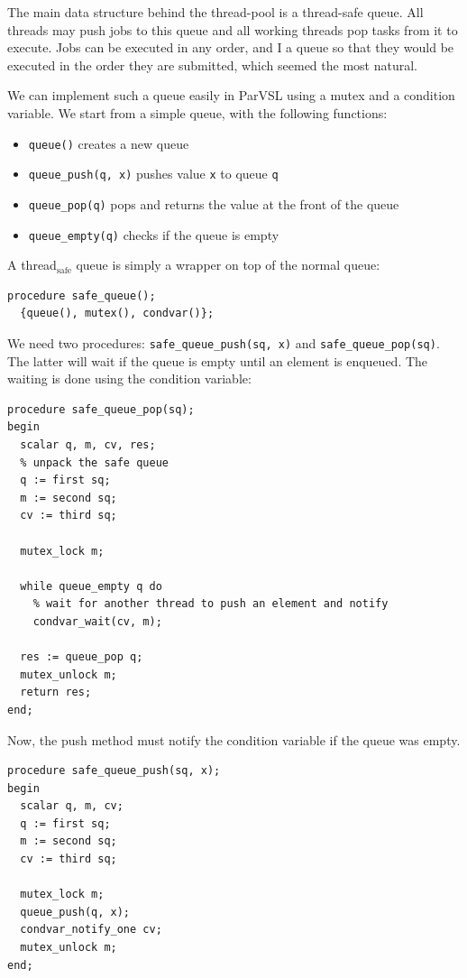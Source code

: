 The main data structure behind the thread-pool is a thread-safe queue. All threads may push
jobs to this queue and all working threads pop tasks from it to execute. Jobs can be executed
in any order, and I a queue so that they would be executed in the order they are submitted, which
seemed the most natural.

We can implement such a queue easily in ParVSL using a mutex and a condition variable. We start
from a simple queue, with the following functions:

\begin{itemize}
\item \texttt{queue()} creates a new queue
\item \texttt{queue\_push(q, x)} pushes value \texttt{x} to queue \texttt{q}
\item \texttt{queue\_pop(q)} pops and returns the value at the front of the queue
\item \texttt{queue\_empty(q)} checks if the queue is empty
\end{itemize}

A thread\(_{\text{safe}}\) queue is simply a wrapper on top of the normal queue:
\begin{verbatim}
procedure safe_queue();
  {queue(), mutex(), condvar()};
\end{verbatim}

We need two procedures: \texttt{safe\_queue\_push(sq, x)} and \texttt{safe\_queue\_pop(sq)}. The latter will
wait if the queue is empty until an element is enqueued. The waiting is done using the condition variable:

\begin{verbatim}
procedure safe_queue_pop(sq);
begin
  scalar q, m, cv, res;
  % unpack the safe queue
  q := first sq;
  m := second sq;
  cv := third sq;

  mutex_lock m;

  while queue_empty q do
    % wait for another thread to push an element and notify
    condvar_wait(cv, m);

  res := queue_pop q;
  mutex_unlock m;
  return res;
end;
\end{verbatim}

Now, the push method must notify the condition variable if the queue was empty.
\begin{verbatim}
procedure safe_queue_push(sq, x);
begin
  scalar q, m, cv;
  q := first sq;
  m := second sq;
  cv := third sq;

  mutex_lock m;
  queue_push(q, x);
  condvar_notify_one cv;
  mutex_unlock m;
end;
\end{verbatim}



